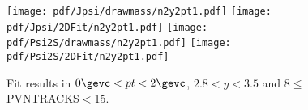 \begin{figure}[H]
\begin{center}
\texttt{[image: pdf/Jpsi/drawmass/n2y2pt1.pdf]}
\texttt{[image: pdf/Jpsi/2DFit/n2y2pt1.pdf]}
\vspace*{-0.5cm}
\texttt{[image: pdf/Psi2S/drawmass/n2y2pt1.pdf]}
\texttt{[image: pdf/Psi2S/2DFit/n2y2pt1.pdf]}
\vspace*{-0.5cm}
\end{center}
\caption{Fit results in $0\gevc<pt<2\gevc$, $2.8<y<3.5$ and 8$\leq$PVNTRACKS$<$15.}
\label{Fitn2y2pt1}
\end{figure}
